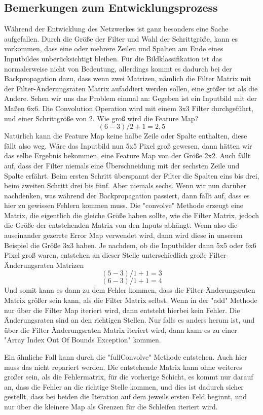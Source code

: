 \documentclass[12pt]{article}
\begin{document}
\subsection{Bemerkungen zum Entwicklungsprozess}
Während der Entwicklung des Netzwerkes ist ganz besonders eine Sache aufgefallen. Durch die Größe der Filter und Wahl der Schrittgröße, kann es vorkommen, dass eine oder mehrere Zeilen und Spalten am Ende eines Inputbildes unberücksichtigt bleiben. Für die Bildklassifikation ist das normalerweise nicht von Bedeutung, allerdings kommt es dadurch bei der Backpropagation dazu, dass wenn zwei Matrizen, nämlich die Filter Matrix mit der Filter-Änderungsraten Matrix aufaddiert werden sollen, eine größer ist als die Andere.
Sehen wir uns das Problem einmal an: Gegeben ist ein Inputbild mit der Maßen 6x6. Die Convolution Operation wird mit einem 3x3 Filter durchgeführt, und einer Schrittgröße von 2. Wie groß wird die Feature Map? 
$$(6-3)/2+1 = 2,5$$
Natürlich kann die Feature Map keine halbe Zeile oder Spalte enthalten, diese fällt also weg. Wäre das Inputbild nun 5x5 Pixel groß gewesen, dann hätten wir das selbe Ergebnis bekommen, eine Feature Map von der Größe 2x2.
Auch fällt auf, dass der Filter niemals eine Überschneidung mit der sechsten Zeile und Spalte erfährt. Beim ersten Schritt überspannt der Filter die Spalten eins bis drei, beim zweiten Schritt drei bis fünf. Aber niemals sechs. 
Wenn wir nun darüber nachdenken, was während der Backpropagation passiert, dann fällt auf, dass es hier zu gewissen Fehlern kommen muss. Die "convolve" Methode erzeugt eine Matrix, die eigentlich die gleiche Größe haben sollte, wie die Filter Matrix, jedoch die Größe der entstehenden Matrix von den Inputs abhängt. Wenn also die auseinander gezerrte Error Map verwendet wird, dann wird diese in unserem Beispiel die Größe 3x3 haben. Je nachdem, ob die Inputbilder dann 5x5 oder 6x6 Pixel groß waren, entstehen an dieser Stelle unterschiedlich große Filter-Änderungsraten Matrizen
$$(5-3)/1+1 = 3$$
$$(6-3)/1+1 = 4$$
Und somit kann es dann zu dem Fehler kommen, dass die Filter-Änderungsraten Matrix größer sein kann, als die Filter Matrix selbst. Wenn in der "add" Methode nur über die Filter Map iteriert wird, dann entsteht hierbei kein Fehler. Die Änderungsraten sind an den richtigen Stellen. Nur falls es anders herum ist, und über die Filter Änderungsraten Matrix iteriert wird, dann kann es zu einer "Array Index Out Of Bounds Exception" kommen. 

Ein ähnliche Fall kann durch die  "fullConvolve" Methode entstehen. Auch hier muss das nicht repariert werden. Die entstehende Matrix kann ohne weiteres großer sein, als die Fehlermatrix, für die vorherige Schicht, es kommt nur darauf an, dass die Fehler an die richtige Stelle kommen, und dies ist dadurch sicher gestellt, dass bei beiden die Iteration auf dem jeweils ersten Feld beginnt, und nur über die kleinere Map als Grenzen für die Schleifen iteriert wird.
\end{document}
